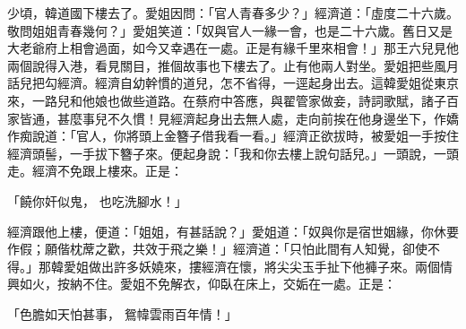 \begin{showcontents}{}
少頃，韓道國下樓去了。愛姐因問：「官人青春多少？」經濟道：「虛度二十六歲。敬問姐姐青春幾何？」愛姐笑道：「奴與官人一緣一會，也是二十六歲。舊日又是大老爺府上相會過面，如今又幸遇在一處。正是有緣千里來相會！」那王六兒見他兩個說得入港，看見關目，推個故事也下樓去了。止有他兩人對坐。愛姐把些風月話兒把勾經濟。經濟自幼幹慣的道兒，怎不省得，一逕起身出去。這韓愛姐從東京來，一路兒和他娘也做些道路。在蔡府中答應，與翟管家做妾，詩詞歌賦，諸子百家皆通，甚麼事兒不久慣！見經濟起身出去無人處，走向前挨在他身邊坐下，作嬌作痴說道：「官人，你將頭上金簪子借我看一看。」經濟正欲拔時，被愛姐一手按住經濟頭髻，一手拔下簪子來。便起身說：「我和你去樓上說句話兒。」一頭說，一頭走。經濟不免跟上樓來。正是：

「饒你奸似鬼，  也吃洗腳水！」

經濟跟他上樓，便道：「姐姐，有甚話說？」愛姐道：「奴與你是宿世姻緣，你休要作假；願偕枕蓆之歡，共效于飛之樂！」經濟道：「只怕此間有人知覺，卻使不得。」那韓愛姐做出許多妖嬈來，摟經濟在懷，將尖尖玉手扯下他褲子來。兩個情興如火，按納不住。愛姐不免解衣，仰臥在床上，交姤在一處。正是：

「色膽如天怕甚事，  鴛幃雲雨百年情！」


\end{showcontents}
